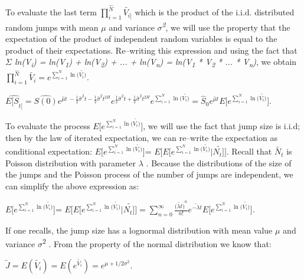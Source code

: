 \documentclass[12pt,a4paper]{report}
\numberwithin{equation}{section}
\begin{document}
To evaluate the last term
\(\prod_{i = 1}^{\widehat{N}}\widetilde{V_{i\rbrack}}\) which is the
product of the i.i.d. distributed random jumps with mean \emph{$\mu$} and
variance \emph{$\sigma$\textsuperscript{2}}, we will use the property that the
expectation of the product of independent random variables is equal to
the product of their expectations. Re--writing this expression and using
the fact that \emph{$\Sigma$ ln(V\textsubscript{i}) = ln(V\textsubscript{1}) + ln(V\textsubscript{2}) + ... + ln(V\textsubscript{n}) = ln(V\textsubscript{1} *
V\textsubscript{2} * ... * V\textsubscript{n})}, we obtain
\(\prod_{i = 1}^{\widehat{N}}\widetilde{V_{i}} = e^{\sum_{i = 1}^{N}{\ln(\widetilde{V_{i})}}}\).

\(\widehat{{E\lbrack S}_{t\rbrack}} = \widehat{S(0)}e^{\widehat{\mu}t\  - \frac{1}{2}{\widehat{\sigma}}^{2}t - \frac{1}{2}{\widehat{\sigma}}^{2}t^{2H}}e^{\frac{1}{2}{\widehat{\sigma}}^{2}t + \frac{1}{2}{\widehat{\sigma}}^{2}t^{2H}}e^{\sum_{i = 1}^{N}{\ln(\widetilde{V_{i})}}} = {\widehat{S}}_{0}e^{\widehat{\mu}t}E\lbrack e^{\sum_{i = 1}^{N}{\ln(\widetilde{V_{i})}}}\){]}.

To evaluate the process
\(E\lbrack e^{\sum_{i = 1}^{N}{\ln(\widetilde{V_{i})}}}\){]}, we will use
the fact that jump size is i.i.d; then by the law of iterated
expectation, we can re--write the expectation as conditional expectation:
\(E\lbrack e^{\sum_{i = 1}^{N}{\ln(\widetilde{V_{i})}}}\){]}=
\(E\lbrack E\lbrack e^{\sum_{i = 1}^{N}{\ln(\widetilde{V_{i})}}}|\widetilde{N_{t}\rbrack\rbrack}\).
Recall that \(\widetilde{N_{t}}\) is Poisson distribution with parameter
\emph{$\lambda$} \cite{merton1976option_93}. Because the distributions of the size of the jumps
and the Poisson process of the number of jumps are independent, we can
simplify the above expression as:

\(E\lbrack e^{\sum_{i = 1}^{N}{\ln(\widetilde{V_{i})}}}\){]}=
\(E\lbrack E\lbrack e^{\sum_{i = 1}^{N}{\ln(\widetilde{V_{i})}}}|\widetilde{N_{t}\rbrack\rbrack} = \sum_{n = 0}^{\infty}{\frac{({\widetilde{\lambda t})}^{n}}{n!}e^{\widetilde{- \lambda t}}E\lbrack e^{\sum_{i = 1}^{N}{\ln(\widetilde{V_{i})}}}\rbrack}\)\emph{.}

If one recalls, the jump size has a lognormal distribution with mean
value $\mu$ and variance $\sigma$\textsuperscript{2} \cite{merton1976option_93}. From the property of
the normal distribution we know that:

\(\widetilde{J} = E(\widetilde{V_{i}}) = E\left( e^{\widetilde{V_{i}}} \right) = e^{\mu + 1/2\sigma^{2}}\).
\end{document}
